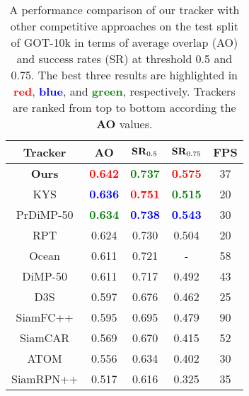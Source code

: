\documentclass[final]{cvpr}
\begin{document}
\begin{table}[!tbp]
 \centering
 \caption{\label{tab:got10k_tab}A performance comparison of our tracker with other competitive approaches on the test split of GOT-10k in terms of average overlap (AO) and success rates (SR) at threshold 0.5 and 0.75. The best three results are highlighted in \textcolor{red}{\textbf{red}}, \textcolor{blue}{\textbf{blue}}, and \textcolor{green}{\textbf{green}}, respectively. Trackers are ranked from top to bottom according the \textbf{AO} values.}
 \vspace{-1.0em}
 \begin{tabular}{cccc|c}
  \toprule
  \textbf{Tracker} & \textbf{AO} & $\textbf{\text{SR}}_{0.5}$ & $\textbf{\text{SR}}_{0.75}$ & \textbf{FPS}\\
  \midrule
  \textbf{Ours} & \textcolor{red}{\textbf{0.642}} & \textcolor{green}{\textbf{0.737}} & \textcolor{red}{\textbf{0.575}} & 37 \\
  KYS \cite{bhat2020know} & \textcolor{blue}{\textbf{0.636}} & \textcolor{red}{\textbf{0.751}} & \textcolor{green}{\textbf{0.515}} & 20 \\
  PrDiMP-50 \cite{danelljan2020probabilistic} & \textcolor{green}{\textbf{0.634}} & \textcolor{blue}{\textbf{0.738}} & \textcolor{blue}{\textbf{0.543}} & 30 \\
  RPT \cite{ma2020rpt} & 0.624 & 0.730 & 0.504 & 20 \\
  Ocean \cite{zhang2020ocean} & 0.611 & 0.721 & - & 58 \\
  DiMP-50 \cite{bhat2019learning} & 0.611 & 0.717 & 0.492 & 43 \\
  D3S \cite{lukezic2020d3s} & 0.597 & 0.676 & 0.462 & 25 \\
  SiamFC++ \cite{xu2020siamfc++} & 0.595 & 0.695 & 0.479 & 90 \\
  SiamCAR \cite{guo2020siamcar} & 0.569 & 0.670 & 0.415 & 52 \\
  ATOM \cite{danelljan2019atom} & 0.556 & 0.634 & 0.402 & 30 \\
  SiamRPN++ \cite{li2019siamrpn++} & 0.517 & 0.616 & 0.325 & 35 \\
  \bottomrule
 \end{tabular}
 \vspace{-1.0em}
\end{table}
\end{document}
